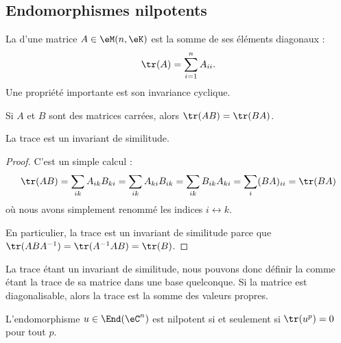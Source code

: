 \subsection{Endomorphismes nilpotents}

La  d'une matrice \( A\in \eM(n,\eK)\) est la somme de ses éléments diagonaux :
\begin{equation}
    \tr(A)=\sum_{i=1}^nA_{ii}.
\end{equation}
Une propriété importante est son invariance cyclique.
\begin{lemma}   \label{LemhbZTay}
    Si \( A\) et \( B\) sont des matrices carrées, alors \( \tr(AB)=\tr(BA)\).

    La trace est un invariant de similitude.
\end{lemma}

\begin{proof}
    C'est un simple calcul :
    \begin{equation}
            \tr(AB)=\sum_{ik}A_{ik}B_{ki}
            =\sum_{ik}A_{ki}B_{ik}
            =\sum_{ik}B_{ik}A_{ki}
            =\sum_i(BA)_{ii}
            =\tr(BA)
    \end{equation}
    où nous avons simplement renommé les indices \( i\leftrightarrow k\).

    En particulier, la trace est un invariant de similitude parce que \( \tr(ABA^{-1})=\tr(A^{-1} AB)=\tr(B)\).
\end{proof}
La trace étant un invariant de similitude, nous pouvons donc définir la  comme étant la trace de sa matrice dans une base quelconque. Si la matrice est diagonalisable, alors la trace est la somme des valeurs propres.

\begin{lemma}   \label{LemzgNOjY}
    L'endomorphisme \( u\in\End(\eC^n)\) est nilpotent si et seulement si \( \tr(u^p)=0\) pour tout \( p\).
\end{lemma}


